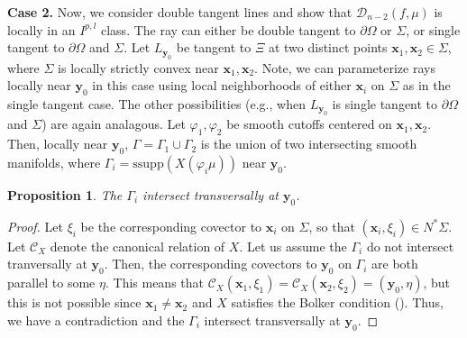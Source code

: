 \documentclass[a4paper,12pt]{amsart}
\numberwithin{equation}{section}
\theoremstyle{plain}
\numberwithin{theorem}{section}
\newtheorem{proposition}[theorem]{Proposition}
\theoremstyle{definition}
\theoremstyle{remark}
\theoremstyle{remark}
\theoremstyle{remark}
\newcommand{\Cc}{\mathcal{C}}
\newcommand{\vx}{{\mathbf{x}}}
\newcommand{\vy}{{\mathbf{y}}}
\newcommand{\ssupp}{\text{ssupp}}
\begin{document}
\textbf{Case 2.} Now, we consider double tangent lines and show that $\mathcal{D}_{n-2}(f,\mu)$ is locally in an $I^{p,l}$ class. The ray can either be double tangent to $\partial \Omega$ or $\Sigma$, or single tangent to $\partial \Omega$ and $\Sigma$. Let $L_{\vy_0}$ be tangent to $\Xi$ at two distinct points $\vx_1, \vx_2 \in \Sigma$, where $\Sigma$ is locally strictly convex near $\vx_1,\vx_2$. Note, we can parameterize rays locally near $\vy_0$ in this case using local neighborhoods of either $\vx_i$ on $\Sigma$ as in the single tangent case. The other possibilities (e.g., when $L_{\vy_0}$ is single tangent to $\partial \Omega$ and $\Sigma$) are again analagous. Let $\varphi_1, \varphi_2$ be smooth cutoffs centered on $\vx_1,\vx_2$. Then, locally near $\vy_0$, $\Gamma = \Gamma_1 \cup \Gamma_2$ is the union of two intersecting smooth manifolds, where $\Gamma_i = \ssupp(X(\varphi_i \mu))$ near $\vy_0$.

\begin{proposition}\label{prop_transverse}
The $\Gamma_i$ intersect transversally at $\vy_0$. 
\end{proposition}
\begin{proof}
Let $\xi_i$ be the corresponding covector to $\vx_i$ on $\Sigma$, so that $(\vx_i,\xi_i) \in N^*\Sigma$. Let $\mathcal{C}_X$ denote the canonical relation of $X$. Let us assume the $\Gamma_i$ do not intersect tranversally at $\vy_0$. Then, the corresponding covectors to $\vy_0$ on $\Gamma_i$ are both parallel to some $\eta$. This means that $\Cc_X(\vx_1,\xi_1) = \Cc_X(\vx_2,\xi_2) = (\vy_0,\eta)$, but this is not possible since $\vx_1 \neq \vx_2$ and $X$ satisfies the Bolker condition (\cite[Proposition 3.1]{monard2015geodesic}). Thus, we have a contradiction and the $\Gamma_i$ intersect transversally at $\vy_0$.
\end{proof}
\end{document}
